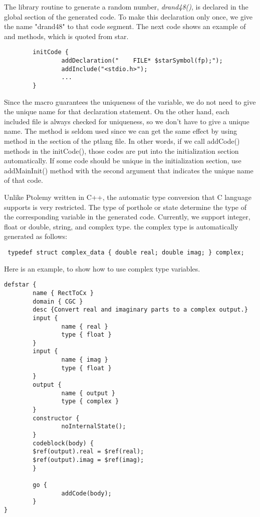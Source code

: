 The library routine to generate a random number, \emph{drand48()},
is declared in the global section of the generated code. To
make this declaration only once, we give the name "drand48" to
that code segment. The next code shows an example of 
and 
methods, which is quoted from 
star.

\begin{verbatim}
        initCode {
                addDeclaration("    FILE* $starSymbol(fp);");
                addInclude("<stdio.h>");
                ...
        }
\end{verbatim}

Since the
macro guarantees the uniqueness of the variable, we do not need to
give the unique name for that declaration statement. On the other
hand, each included file is always checked for uniqueness, so we don't
have to give a unique name. The 
method is seldom used since we can get the same effect by using
method in the 
section of the ptlang file. In other words, if we call addCode()
methods in the initCode(), those codes  are put into the
initialization section automatically. If some code should be unique
in the initialization section, use addMainInit() method with the
second argument that indicates the unique name of that code.

Unlike Ptolemy written in C++, the automatic 
type conversion that C language supports is very restricted.
The type of porthole or state determine the type of the
corresponding variable in the generated code. Currently, we
support integer, float or double, string, and complex type.
the complex type is automatically generated as follows:

\begin{verbatim}
 typedef struct complex_data { double real; double imag; } complex;
\end{verbatim}

Here is an example,
to show how to use complex type variables.

\begin{verbatim}
defstar {
        name { RectToCx }
        domain { CGC }
        desc {Convert real and imaginary parts to a complex output.}
        input {
                name { real }
                type { float }
        }
        input {
                name { imag }
                type { float }
        }
        output {
                name { output }
                type { complex }
        }
        constructor {
                noInternalState();
        }
        codeblock(body) {
        $ref(output).real = $ref(real);
        $ref(output).imag = $ref(imag);
        }
        
        go {
                addCode(body);
        }
}
\end{verbatim}

